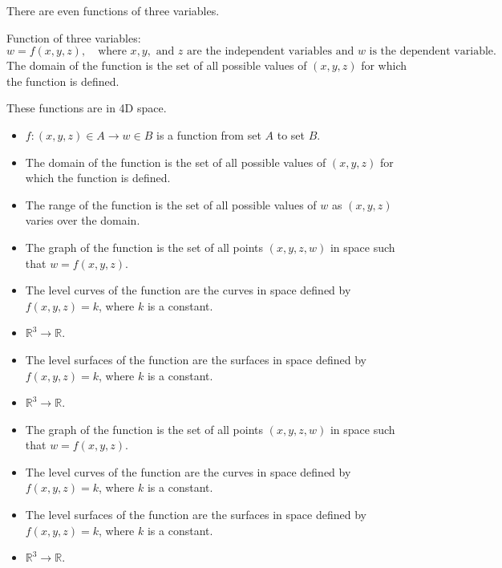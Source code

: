 \documentclass{article}
\begin{document}
There are even functions of three variables.
\begin{definitionbox}
Function of three variables:
\[
    w = f(x, y, z), \quad \text{where } x, y, \text{ and } z \text{ are the independent variables and } w \text{ is the dependent variable}.
\]
The domain of the function is the set of all possible values of \( (x, y, z) \) for which the function is defined.
\begin{notebox}
These functions are in 4D space.
\begin{itemize}
    \item \( f: (x, y, z) \in A \to w \in B \) is a function from set \( A \) to set \( B \).
    \item The domain of the function is the set of all possible values of \( (x, y, z) \) for which the function is defined.
    \item The range of the function is the set of all possible values of \( w \) as \( (x, y, z) \) varies over the domain.
    \item The graph of the function is the set of all points \( (x, y, z, w) \) in space such that \( w = f(x, y, z) \).
    \item The level curves of the function are the curves in space defined by \( f(x, y, z) = k \), where \( k \) is a constant.
    \item \( \mathbb{R}^3 \to \mathbb{R} \).
    \item The level surfaces of the function are the surfaces in space defined by \( f(x, y, z) = k \), where \( k \) is a constant.
    \item \( \mathbb{R}^3 \to \mathbb{R} \).
    \item The graph of the function is the set of all points \( (x, y, z, w) \) in space such that \( w = f(x, y, z) \).
    \item The level curves of the function are the curves in space defined by \( f(x, y, z) = k \), where \( k \) is a constant.
    \item The level surfaces of the function are the surfaces in space defined by \( f(x, y, z) = k \), where \( k \) is a constant.
    \item \( \mathbb{R}^3 \to \mathbb{R} \).
\end{itemize}
\end{notebox}
\end{definitionbox}
\end{document}
